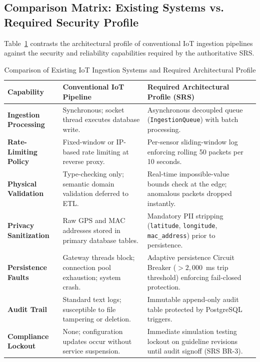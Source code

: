 \subsection{Comparison Matrix: Existing Systems vs. Required Security Profile}
Table~\ref{tab:existing_vs_required} contrasts the architectural profile of conventional IoT ingestion pipelines against the security and reliability capabilities required by the authoritative SRS.

\begin{table}[H]
\centering
\caption{Comparison of Existing IoT Ingestion Systems and Required Architectural Profile}
\label{tab:existing_vs_required}
\small
\begin{tabularx}{\linewidth}{@{}p{3.2cm} X X@{}}
\toprule
\textbf{Capability} & \textbf{Conventional IoT Pipeline} & \textbf{Required Architectural Profile (SRS)} \\
\midrule
\textbf{Ingestion Processing} & Synchronous; socket thread executes database write. & Asynchronous decoupled queue (\texttt{IngestionQueue}) with batch processing. \\
\addlinespace
\textbf{Rate-Limiting Policy} & Fixed-window or IP-based rate limiting at reverse proxy. & Per-sensor sliding-window log enforcing rolling 50 packets per 10 seconds. \\
\addlinespace
\textbf{Physical Validation} & Type-checking only; semantic domain validation deferred to ETL. & Real-time impossible-value bounds check at the edge; anomalous packets dropped instantly. \\
\addlinespace
\textbf{Privacy Sanitization} & Raw GPS and MAC addresses stored in primary database tables. & Mandatory PII stripping (\texttt{latitude}, \texttt{longitude}, \texttt{mac\_address}) prior to persistence. \\
\addlinespace
\textbf{Persistence Faults} & Gateway threads block; connection pool exhaustion; system crash. & Adaptive persistence Circuit Breaker ($> 2,000$~ms trip threshold) enforcing fail-closed protection. \\
\addlinespace
\textbf{Audit Trail} & Standard text logs; susceptible to file tampering or deletion. & Immutable append-only audit table protected by PostgreSQL triggers. \\
\addlinespace
\textbf{Compliance Lockout} & None; configuration updates occur without service suspension. & Immediate simulation testing lockout on guideline revisions until audit signoff (SRS BR-3). \\
\bottomrule
\end{tabularx}
\end{table}
